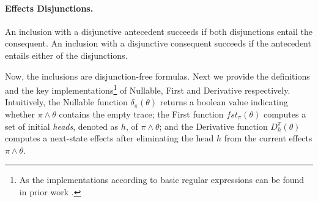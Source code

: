 \documentclass[acmsmall,10pt,review]{acmart}
\newcommand{\es}{\theta}
\newcommand{\code}[1]{{\tt{\ensuremath{\m{#1}}}}}
\newcommand{\m}{\mathit}
\begin{document}
{\paragraph{\textbf{Effects Disjunctions.}}
An inclusion with a disjunctive antecedent succeeds if both disjunctions entail the consequent.  An inclusion with a disjunctive consequent succeeds if the antecedent entails either of the disjunctions.  
{ 

}

Now, the inclusions are disjunction-free formulas. 
Next we provide the definitions and the key implementations\footnote{As 
the implementations according to basic regular expressions can be found 
in prior work \cite{DBLP:conf/fsttcs/KeilT14}. 
} of Nullable, First and Derivative respectively. Intuitively, 
the Nullable function \code{\delta_{{\pi}}(\es)} returns a boolean 
value indicating whether \code{{\pi} \wedge \es} contains the empty 
trace; the First function \code{fst_{{\pi}}( \es)} computes a set of 
 initial \emph{heads}, denoted as \code{h},  of \code{{\pi} \wedge \es}; and the Derivative 
function \code{D^{\pi}_{h}(\es)} computes a next-state 
effects after eliminating the head  \code{h} from the current 
effects \code{{\pi} \wedge \es}. 

%


}
\end{document}
